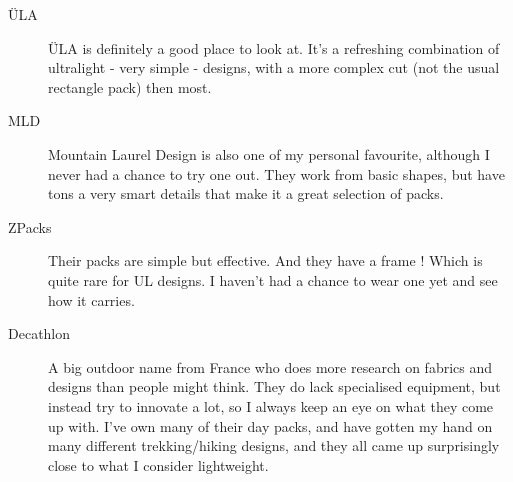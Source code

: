 \begin{description}
  \item [ÜLA] ÜLA is definitely a good place to look at. It’s a refreshing combination of ultralight - very simple - designs, with a more complex cut (not the usual rectangle pack) then most.

  \item [MLD] Mountain Laurel Design is also one of my personal favourite, although I never had a chance to try one out. They work from basic shapes, but have tons a very smart details that make it a great selection of packs.

  \item [ZPacks] Their packs are simple but effective. And they have a frame ! Which is quite rare for UL designs. I haven’t had a chance to wear one yet and see how it carries.

  \item [Decathlon] A big outdoor name from France who does more research on fabrics and designs than people might think. They do lack specialised equipment, but instead try to innovate a lot, so I always keep an eye on what they come up with. I’ve own many of their day packs, and have gotten my hand on many different trekking/hiking designs, and they all came up surprisingly close to what I consider lightweight.

\end{description}
